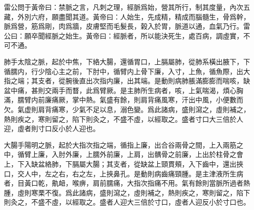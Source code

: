 \documentclass[12pt]{ctexbook}%
\begin{document}
\begin{yuanwen}
雷公問于黃帝曰：禁脈之言，凡刺之理，經脈爲始，營其所行，制其度量，內次五藏，外別六府，願盡聞其道。黃帝曰：人始生，先成精，精成而腦髓生，骨爲幹，脈爲營，筋爲剛，肉爲牆，皮膚堅而毛髮長，榖入於胃，脈道以通，血氣乃行。雷公曰：願卒聞經脈之始生。黃帝曰：經脈者，所以能決死生，處百病，調虛實，不可不通。

肺手太陰之脈，起於中焦，下絡大腸，還循胃口，上膈屬肺，從肺系橫出腋下，下循臑内，行少陰心主之前，下肘中，循臂内上骨下廉，入寸，上魚，循魚際，出大指之端；其支者，從腕後直出次指内廉，出其端。是動則病肺脹滿膨膨而喘咳，缺盆中痛，甚則交兩手而瞀，此爲臂厥。是主肺所生病者，咳，上氣喘渴，煩心胸滿，臑臂内前廉痛厥，掌中熱。氣盛有餘，則肩背痛風寒，汗出中風，小便數而欠。氣虚則肩背痛寒，少氣不足以息，溺色變。爲此諸病，盛則瀉之，虛則補之，熱則疾之，寒則留之，陷下則灸之，不盛不虛，以經取之。盛者寸口大三倍於人迎，虛者則寸口反小於人迎也。

大腸手陽明之脈，起於大指次指之端，循指上廉，出合谷兩骨之間，上入兩筋之中，循臂上廉，入肘外廉，上臑外前廉，上肩，出髃骨之前廉，上出於柱骨之會上，下入缺盆絡肺，下膈屬大腸；其支者，從缺盆上頸貫頰，入下齒中，還出挾口，交人中，左之右，右之左，上挾鼻孔。是動則病齒痛頸腫。是主津液所生病者，目黃口乾，鼽衄，喉痹，肩前臑痛，大指次指痛不用。氣有餘則當脈所過者熱腫，虛則寒栗不復。爲此諸病，盛則瀉之，虛則補之，熱則疾之，寒則留之，陷下則灸之，不盛不虛，以經取之。盛者人迎大三倍於寸口，虛者人迎反小於寸口也。
\end{yuanwen}

\end{document}
